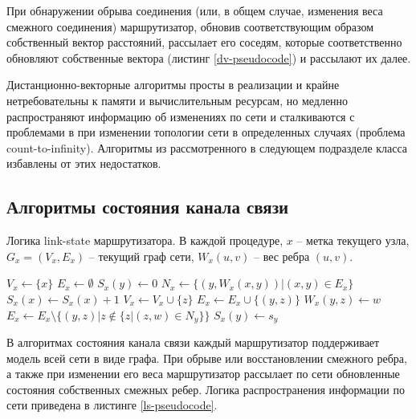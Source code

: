 \documentclass[specification,annotation,times]{itmo-student-thesis}
\theoremstyle{definition}
\begin{document}
При обнаружении обрыва соединения (или, в общем случае, изменения веса смежного
соединения) маршрутизатор, обновив соответствующим образом собственный вектор
расстояний, рассылает его соседям, которые соответственно обновляют собственные
вектора (листинг \ref{dv-pseudocode}) и рассылают их далее.

Дистанционно-векторные алгоритмы просты в реализации и крайне нетребовательны к
памяти и вычислительным ресурсам, но медленно распространяют информацию об
изменениях по сети и сталкиваются с проблемами в при изменении топологии сети в
определенных случаях (проблема count-to-infinity). Алгоритмы из рассмотренного в
следующем подразделе класса избавлены от этих недостатков.

\subsection{Алгоритмы состояния канала связи}\label{overview:link-state}

\begin{algorithm}[!h]
\caption{Логика link-state маршрутизатора. В каждой процедуре, $x$ -- метка
  текущего узла, $G_x = (V_x, E_x)$ -- текущий граф сети, $W_x(u, v)$ -- вес ребра
  $(u, v)$.}
\label{ls-pseudocode}
\begin{algorithmic}[1]
    \State $V_x \gets \{x\}$
    \State $E_x \gets \emptyset$
      \State $S_x(y) \gets 0$
    \EndFor
    \State {}
  \EndProcedure
  \Statex
    \State $N_x \gets \{(y, W_x(x, y)) | (x, y) \in E_x\}$
      \State {}
    \EndFor
    \State $S_x(x) \gets S_x(x) + 1$
  \EndProcedure
  \Statex
       
        \State $V_x \gets V_x \cup \{z\}$
        \State $E_x \gets E_x \cup \{(y, z)\}$
        \State $W_x(y, z) \gets w$
      \EndFor
      \State $E_x \gets E_x \setminus \{(y, z) | z \notin \{z | (z, w) \in N_y \} \}$
      \State $S_x(y) \gets s_y$
        \State {}
      \EndFor
    \EndIf
	\EndProcedure
\end{algorithmic}
\end{algorithm}

В алгоритмах состояния канала связи каждый маршрутизатор поддерживает модель
всей сети в виде графа. При обрыве или восстановлении смежного ребра, а также при
изменении его веса маршрутизатор рассылает по сети обновленные состояния
собственных смежных ребер. Логика распространения информации по сети приведена в
листинге \ref{ls-pseudocode}.
\end{document}
